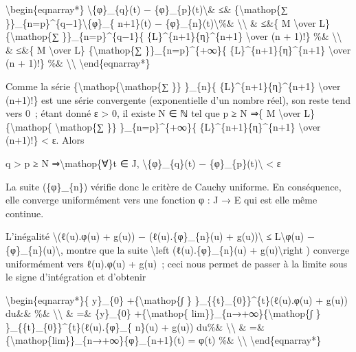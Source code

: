 \documentclass[]{article}
\begin{document}
\textbackslash{}begin\{eqnarray*\}
\textbackslash{}\textbar{}\{φ\}\_\{q\}(t) −
\{φ\}\_\{p\}(t)\textbackslash{}\textbar{}\& ≤\&
\{\textbackslash{}mathop\{∑
\}\}\_\{n=p\}\^{}\{q−1\}\textbackslash{}\textbar{}\{φ\}\_\{ n+1\}(t) −
\{φ\}\_\{n\}(t)\textbackslash{}\textbar{}\%\&
\textbackslash{}\textbackslash{} \& ≤\&\{ M \textbackslash{}over L\}
\{\textbackslash{}mathop\{∑ \}\}\_\{n=p\}\^{}\{q−1\}\{
\{L\}\^{}\{n+1\}\{η\}\^{}\{n+1\} \textbackslash{}over (n + 1)!\} \%\&
\textbackslash{}\textbackslash{} \& ≤\&\{ M \textbackslash{}over L\}
\{\textbackslash{}mathop\{∑ \}\}\_\{n=p\}\^{}\{+∞\}\{
\{L\}\^{}\{n+1\}\{η\}\^{}\{n+1\} \textbackslash{}over (n + 1)!\} \%\&
\textbackslash{}\textbackslash{} \textbackslash{}end\{eqnarray*\}

Comme la série \{\textbackslash{}mathop\{\textbackslash{}mathop\{∑ \}\}
\}\_\{n\}\{ \{L\}\^{}\{n+1\}\{η\}\^{}\{n+1\} \textbackslash{}over
(n+1)!\} est une série convergente (exponentielle d'un nombre réel), son
reste tend vers 0~; étant donné ε \textgreater{} 0, il existe N ∈ ℕ tel
que p ≥ N ⇒\{ M \textbackslash{}over L\} \{\textbackslash{}mathop\{
\textbackslash{}mathop\{∑ \}\} \}\_\{n=p\}\^{}\{+∞\}\{
\{L\}\^{}\{n+1\}\{η\}\^{}\{n+1\} \textbackslash{}over (n+1)!\}
\textless{} ε. Alors

q \textgreater{} p ≥ N ⇒\textbackslash{}mathop\{∀\}t ∈ J,
\textbackslash{}\textbar{}\{φ\}\_\{q\}(t) −
\{φ\}\_\{p\}(t)\textbackslash{}\textbar{} \textless{} ε

La suite (\{φ\}\_\{n\}) vérifie donc le critère de Cauchy uniforme. En
conséquence, elle converge uniformément vers une fonction φ : J → E qui
est elle même continue.

L'inégalité \textbackslash{}\textbar{}(ℓ(u).φ(u) + g(u)) −
(ℓ(u).\{φ\}\_\{n\}(u) + g(u))\textbackslash{}\textbar{} ≤
L\textbackslash{}\textbar{}φ(u) −
\{φ\}\_\{n\}(u)\textbackslash{}\textbar{}, montre que la suite
\textbackslash{}left (ℓ(u).\{φ\}\_\{n\}(u) + g(u)\textbackslash{}right )
converge uniformément vers ℓ(u).φ(u) + g(u)~; ceci nous permet de passer
à la limite sous le signe d'intégration et d'obtenir

\textbackslash{}begin\{eqnarray*\}\{ y\}\_\{0\}
+\{\textbackslash{}mathop\{∫ \} \}\_\{\{t\}\_\{0\}\}\^{}\{t\}(ℓ(u).φ(u)
+ g(u)) du\&\& \%\& \textbackslash{}\textbackslash{} \& =\& \{y\}\_\{0\}
+\{\textbackslash{}mathop\{ lim\}\}\_\{n→+∞\}\{\textbackslash{}mathop\{∫
\} \}\_\{\{t\}\_\{0\}\}\^{}\{t\}(ℓ(u).\{φ\}\_\{ n\}(u) + g(u)) du\%\&
\textbackslash{}\textbackslash{} \& =\&
\{\textbackslash{}mathop\{lim\}\}\_\{n→+∞\}\{φ\}\_\{n+1\}(t) = φ(t) \%\&
\textbackslash{}\textbackslash{} \textbackslash{}end\{eqnarray*\}
\end{document}
